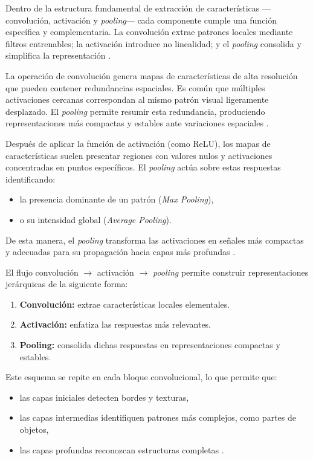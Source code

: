 	Dentro de la estructura fundamental de extracción de características —convolución, activación y \textit{pooling}— cada componente cumple una función específica y complementaria. La convolución extrae patrones locales mediante filtros entrenables; la activación introduce no linealidad; y el \textit{pooling} consolida y simplifica la representación \cite{goodfellow2016dl}.
	
	La operación de convolución genera mapas de características de alta resolución que pueden contener redundancias espaciales. Es común que múltiples activaciones cercanas correspondan al mismo patrón visual ligeramente desplazado. El \textit{pooling} permite resumir esta redundancia, produciendo representaciones más compactas y estables ante variaciones espaciales \cite{scherer2010}.
	
	Después de aplicar la función de activación (como ReLU), los mapas de características suelen presentar regiones con valores nulos y activaciones concentradas en puntos específicos. El \textit{pooling} actúa sobre estas respuestas identificando:
	\begin{itemize}
		\item la presencia dominante de un patrón (\textit{Max Pooling}),
		\item o su intensidad global (\textit{Average Pooling}).
	\end{itemize}
	
	De esta manera, el \textit{pooling} transforma las activaciones en señales más compactas y adecuadas para su propagación hacia capas más profundas \cite{goodfellow2016dl}.
	
	El flujo convolución $\rightarrow$ activación $\rightarrow$ \textit{pooling} permite construir representaciones jerárquicas de la siguiente forma:
	\begin{enumerate}
		\item \textbf{Convolución:} extrae características locales elementales.
		\item \textbf{Activación:} enfatiza las respuestas más relevantes.
		\item \textbf{Pooling:} consolida dichas respuestas en representaciones compactas y estables.
	\end{enumerate}
	
	Este esquema se repite en cada bloque convolucional, lo que permite que:
	\begin{itemize}
		\item las capas iniciales detecten bordes y texturas,
		\item las capas intermedias identifiquen patrones más complejos, como partes de objetos,
		\item las capas profundas reconozcan estructuras completas \cite{scherer2010}.
	\end{itemize}
	
